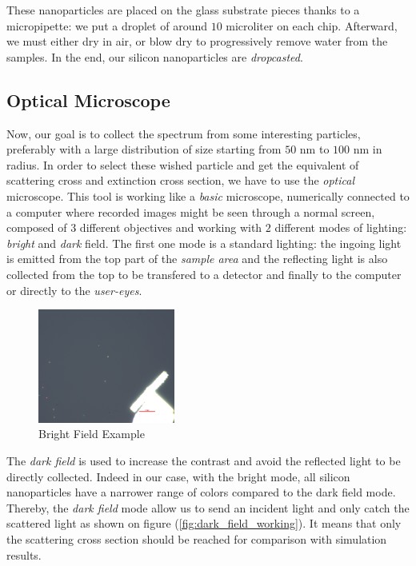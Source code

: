 \documentclass{article}
\numberwithin{equation}{section}
\begin{document}
These nanoparticles are placed on the glass substrate pieces thanks to a micropipette: we put a droplet of around $10$ microliter on each chip. Afterward, we must either dry in air, or blow dry to progressively remove water from the samples. In the end, our silicon nanoparticles are \textit{dropcasted}.

\subsection{Optical Microscope}

Now, our goal is to collect the spectrum from some interesting particles, preferably with a large distribution of size starting from $50$ nm to $100$ nm in radius. In order to select these wished particle and get the equivalent of scattering cross and extinction cross section, we have to use the \textit{optical} microscope. This tool is working like a \textit{basic} microscope, numerically connected to a computer where recorded images might be seen through a normal screen, composed of $3$ different objectives and working with $2$ different modes of lighting: \textit{bright} and \textit{dark} field. The first one mode is a standard lighting: the ingoing light is emitted from the top part of the \textit{sample area} and the reflecting light is also collected from the top to be transfered to a detector and finally to the computer or directly to the \textit{user-eyes}.
\begin{figure}[h!]
    \centering
    \includegraphics[width=0.4\textwidth, height=0.35\textwidth]{bright_field_ex.png}
    \caption{Bright Field Example}
    \label{fig:bright_field_ex}
\end{figure}
The \textit{dark field} is used to increase the contrast and avoid the reflected light to be directly collected. Indeed in our case, with the bright mode, all silicon nanoparticles have a narrower range of colors compared to the dark field mode. Thereby, the \textit{dark field} mode allow us to send an incident light and only catch the scattered light as shown on figure (\ref{fig:dark_field_working}). It means that only the scattering cross section should be reached for comparison with simulation results.
\end{document}
